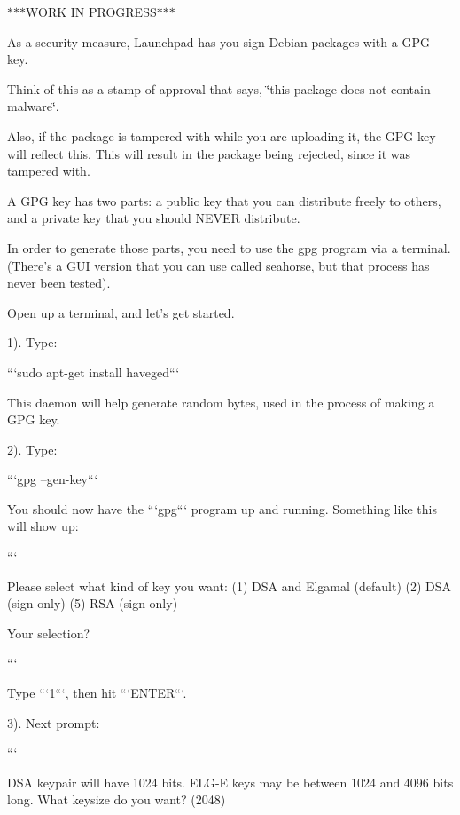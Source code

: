 $\ast$$\ast$$\ast$\-W\-O\-R\-K I\-N P\-R\-O\-G\-R\-E\-S\-S$\ast$$\ast$$\ast$

As a security measure, Launchpad has you sign Debian packages with a G\-P\-G key.

Think of this as a stamp of approval that says, \char`\"{}this package does not contain malware\char`\"{}.

Also, if the package is tampered with while you are uploading it, the G\-P\-G key will reflect this. This will result in the package being rejected, since it was tampered with.

A G\-P\-G key has two parts\-: a public key that you can distribute freely to others, and a private key that you should N\-E\-V\-E\-R distribute.

In order to generate those parts, you need to use the {\ttfamily gpg} program via a terminal. (There's a G\-U\-I version that you can use called {\ttfamily seahorse}, but that process has never been tested).

Open up a terminal, and let's get started.

1). Type\-: \begin{DoxyVerb}```sudo apt-get install haveged```

This daemon will help generate random bytes, used in the process of making a GPG key. 
\end{DoxyVerb}


2). Type\-: \begin{DoxyVerb}```gpg --gen-key```

You should now have the ```gpg``` program up and running. Something like this will show up:
\end{DoxyVerb}


``` \begin{DoxyVerb}Please select what kind of key you want:
(1) DSA and Elgamal (default)
(2) DSA (sign only)
(5) RSA (sign only)

Your selection? 
\end{DoxyVerb}


``` \begin{DoxyVerb}Type ```1```, then hit ```ENTER```.
\end{DoxyVerb}


3). Next prompt\-:

``` \begin{DoxyVerb}DSA keypair will have 1024 bits.
ELG-E keys may be between 1024 and 4096 bits long.
What keysize do you want? (2048)
\end{DoxyVerb}


